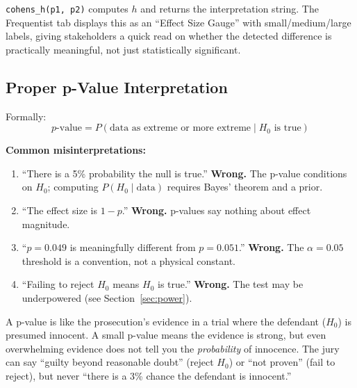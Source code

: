 \documentclass[11pt,a4paper]{article}
\newcommand{\code}[1]{\texttt{#1}}
\begin{document}
\vspace{8pt}

\begin{application}
\code{cohens\_h(p1, p2)} computes $h$ and returns the interpretation string. The Frequentist tab displays this as an ``Effect Size Gauge'' with small/medium/large labels, giving stakeholders a quick read on whether the detected difference is practically meaningful, not just statistically significant.
\end{application}

\subsection{Proper p-Value Interpretation}

\begin{formaldef}
Formally:
\[
p\text{-value} = P(\text{data as extreme or more extreme} \mid H_0 \text{ is true})
\]

\textbf{Common misinterpretations:}
\begin{enumerate}[nosep]
  \item ``There is a 5\% probability the null is true.'' \textbf{Wrong.} The p-value conditions on $H_0$; computing $P(H_0 \mid \text{data})$ requires Bayes' theorem and a prior.
  \item ``The effect size is $1 - p$.'' \textbf{Wrong.} p-values say nothing about effect magnitude.
  \item ``$p = 0.049$ is meaningfully different from $p = 0.051$.'' \textbf{Wrong.} The $\alpha = 0.05$ threshold is a convention, not a physical constant.
  \item ``Failing to reject $H_0$ means $H_0$ is true.'' \textbf{Wrong.} The test may be underpowered (see Section~\ref{sec:power}).
\end{enumerate}
\end{formaldef}

\vspace{8pt}

\begin{intuition}
A p-value is like the prosecution's evidence in a trial where the defendant ($H_0$) is presumed innocent. A small p-value means the evidence is strong, but even overwhelming evidence does not tell you the \emph{probability} of innocence. The jury can say ``guilty beyond reasonable doubt'' (reject $H_0$) or ``not proven'' (fail to reject), but never ``there is a 3\% chance the defendant is innocent.''
\end{intuition}
\end{document}
